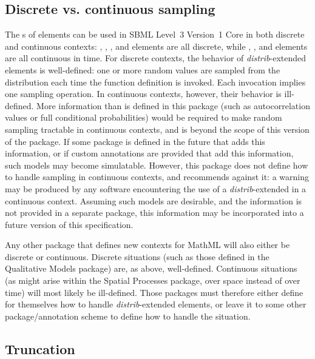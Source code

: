 \documentclass[draftspec]{sbmlpkgspec}
\newcommand{\sbmlthreecore}{SBML Level~3 Version~1 Core\xspace}
\newcommand{\distribshort}{\emph{distrib}\xspace}
\begin{document}
\subsection{Discrete vs. continuous sampling}
\label{discrete-continuous}

The s of \FunctionDefinition elements can be used in \sbmlthreecore in both discrete and continuous contexts:  \InitialAssignment, \EventAssignment, \Priority, and \Delay elements are all discrete, while \Rule, \KineticLaw, and \Trigger elements are all continuous in time.  For discrete contexts, the behavior of \distribshort-extended \FunctionDefinition elements is well-defined:  one or more random values are sampled from the distribution each time the function definition is invoked. Each invocation implies one sampling operation.  In continuous contexts, however, their behavior is ill-defined.  More information than is defined in this package (such as autocorrelation values or full conditional probabilities) would be required to make random sampling tractable in continuous contexts, and is beyond the scope of this version of the package.  If some package is defined in the future that adds this information, or if custom annotations are provided that add this information, such models may become simulatable.  However, this package does not define how to handle sampling in continuous contexts, and recommends against it: a warning may be produced by any software encountering the use of a \distribshort-extended \FunctionDefinition in a continuous context.  Assuming such models are desirable, and the information is not provided in a separate package, this information may be incorporated into a future version of this specification.

Any other package that defines new contexts for MathML will also either be discrete or continuous.  Discrete situations (such as those defined in the Qualitative Models package) are, as above, well-defined.  Continuous situations (as might arise within the Spatial Processes package, over space instead of over time) will most likely be ill-defined.  Those packages must therefore either define for themselves how to handle \distribshort-extended \FunctionDefinition elements, or leave it to some other package/annotation scheme to define how to handle the situation.

\subsection{Truncation}
\label{truncation}
\end{document}
